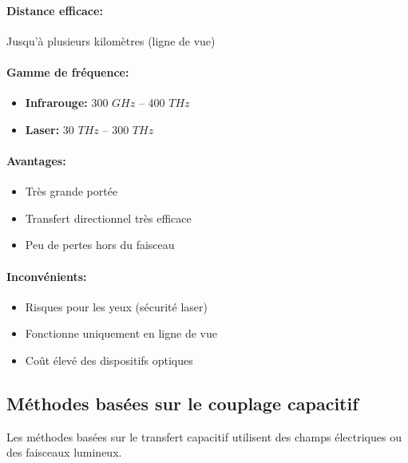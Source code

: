\documentclass[12pt,a4paper,titlepage,notitlepage]{article}
\begin{document}
	\paragraph{Distance efficace: \\}
	Jusqu’à plusieurs kilomètres (ligne de vue)
	\paragraph{Gamme de fréquence: }
	\begin{itemize}
		\item \textbf{Infrarouge:} 300 $GHz$ – 400 $THz$
		\item \textbf{Laser:} 30 $THz$ – 300 $THz$
	\end{itemize}
	\paragraph{Avantages: }
	\begin{itemize}
		\item Très grande portée
		\item Transfert directionnel très efficace
		\item Peu de pertes hors du faisceau
	\end{itemize}
	\paragraph{Inconvénients: }
	\begin{itemize}
		\item Risques pour les yeux (sécurité laser)
		\item Fonctionne uniquement en ligne de vue
		\item Coût élevé des dispositifs optiques
	\end{itemize}
	
	\subsection{Méthodes basées sur le couplage capacitif}
	Les méthodes basées sur le transfert capacitif utilisent des champs électriques ou des faisceaux lumineux.
	
\end{document}
